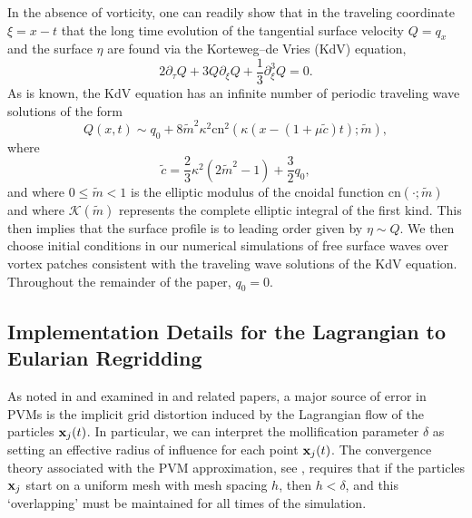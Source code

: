 \documentclass[a4paper,11pt]{article}
\newcommand{\p}{\partial}
\begin{document}
In the absence of vorticity, one can readily show that in the traveling coordinate $\xi = x-t$ that the long time evolution of the tangential surface velocity $Q = q_{x}$ and the surface $\eta$ are found via the Korteweg--de Vries (KdV) equation, 
\[
2\p_{\tau}Q + 3Q\p_{\xi}Q + \frac{1}{3} \p_{\xi}^{3}Q = 0.
\]
As is known, the KdV equation has an infinite number of periodic traveling wave solutions of the form 
\begin{equation}
Q(x,t) \sim q_{0} + 8 \tilde{m}^{2}\kappa^{2}\mbox{cn}^{2}\left(\kappa \left( x- \left(1 + \mu \tilde{c}\right)t\right);\tilde{m}\right),
\label{kdvsolpot}
\end{equation}
where
\[
\tilde{c} = \frac{2}{3}\kappa^{2} (2\tilde{m}^{2}-1)+\frac{3}{2}q_{0},
\]
and where $0\leq \tilde{m}<1$ is the elliptic modulus of the cnoidal function $\mbox{cn}(\cdot;\tilde{m})$ and where $\mathcal{K}(\tilde{m})$ represents the complete elliptic integral of the first kind.  This then implies that the surface profile is to leading order given by $\eta \sim Q$.  We then choose initial conditions in our numerical simulations of free surface waves over vortex patches consistent with the traveling wave solutions of the KdV equation.  Throughout the remainder of the paper, $q_{0}=0$.  

\subsection*{Implementation Details for the Lagrangian to Eularian Regridding}
As noted in \cite{beale} and examined in \cite{cottet} and related papers, a major source of error in PVMs is the implicit grid distortion induced by the Lagrangian flow of the particles ${\bf x}_{j}(t)$.  In particular, we can interpret the mollification parameter $\delta$ as setting an effective radius of influence for each point ${\bf x}_{j}(t)$.  The convergence theory associated with the PVM approximation, see \cite{cottet2}, requires that if the particles ${\bf x}_{j}$ start on a uniform mesh with mesh spacing $h$, then $h < \delta$, and this `overlapping' must be maintained for all times of the simulation.  
\end{document}
